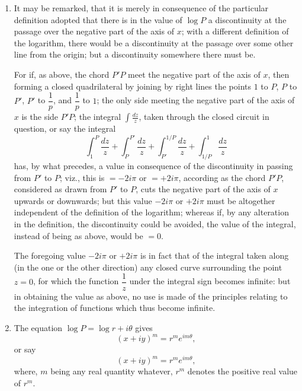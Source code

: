 \documentclass[12pt,a4paper]{article}
\theoremstyle{plain}
\theoremstyle{definition}
\theoremstyle{remark}
\begin{document}
\begin{enumerate}[label=\arabic*.]
But if the chord $P'P''$ does not cut the negative part of the axis of $x$, then there is not any discontinuity, and the true value of the definite integral is $= \log P'' - \log P'$.

We have thus in the three cases respectively
\[\log p = \log P'' - \log P', \quad p = \log P'' - \log P' + 2i\pi, \quad p = \log P'' - \log P' - 2i\pi,\]
which agrees with the previous results.

\item It may be remarked, that it is merely in consequence of the particular definition adopted that there is in the value of $\log P$ a discontinuity at the passage over the negative part of the axis of $x$; with a different definition of the logarithm, there would be a discontinuity at the passage over some other line from the origin; but a discontinuity somewhere there must be.

For if, as above, the chord $P'P$ meet the negative part of the axis of $x$, then forming a closed quadrilateral by joining by right lines the points $1$ to $P$, $P$ to $P'$, $P'$ to $\dfrac{1}{p}$, and $\dfrac{1}{p}$ to $1$; the only side meeting the negative part of the axis of $x$ is the side $P'P$; the integral $\displaystyle\int \frac{dz}{z}$, taken through the closed circuit in question, or say the integral
\[\int_1^P \frac{dz}{z} + \int_P^{P'} \frac{dz}{z} + \int_{P'}^{1/P} \frac{dz}{z} + \int_{1/P}^{1} \frac{dz}{z}\]
has, by what precedes, a value in consequence of the discontinuity in passing from $P'$ to $P$; viz., this is $= -2i\pi$ or $= +2i\pi$, according as the chord $P'P$, considered as drawn from $P'$ to $P$, cuts the negative part of the axis of $x$ upwards or downwards; but this value $-2i\pi$ or $+2i\pi$ must be altogether independent of the definition of the logarithm; whereas if, by any alteration in the definition, the discontinuity could be avoided, the value of the integral, instead of being as above, would be $= 0$.

The foregoing value $-2i\pi$ or $+2i\pi$ is in fact that of the integral taken along (in the one or the other direction) any closed curve surrounding the point $z = 0$, for which the function $\dfrac{1}{z}$ under the integral sign becomes infinite: but in obtaining the value as above, no use is made of the principles relating to the integration of functions which thus become infinite.

\item The equation $\log P = \log r + i\theta$ gives
\[(x + iy)^{m} = r^{m} e^{im\theta},\]
or say
\[(x + iy)^{m} = r^{m} e^{im\theta},\]
where, $m$ being any real quantity whatever, $r^{m}$ denotes the positive real value of $r^{m}$.


\end{enumerate}
\end{document}
